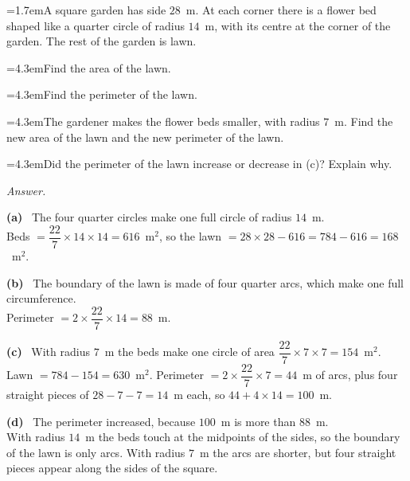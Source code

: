 \documentclass[11pt,a4paper]{article}
\newcommand{\nl}{\\[3pt]}
\newcounter{qn}
\newcommand{\ques}{\par\medskip\refstepcounter{qn}\noindent\hangindent=1.7em\hangafter=1\makebox[1.7em][l]{\textbf{\arabic{qn}.}}\ignorespaces}
\newcommand{\pc}[2]{\par\smallskip\noindent\hspace*{2em}\hangindent=4.3em\hangafter=1\makebox[2em][l]{(#1)}\hspace{0.3em}#2\par}
\newenvironment{answerblock}
  {\par\needspace{6\baselineskip}\smallskip\begingroup\small\linespread{1.2}\selectfont\color{muted}\noindent\textit{Answer.}\par}
  {\par\endgroup\medskip}
\newcommand{\ap}[1]{\par\smallskip\noindent\textbf{(#1)}\ }
\begin{document}
\ques A square garden has side $28$~m. At each corner there is a flower bed shaped like a quarter circle of radius $14$~m, with its centre at the corner of the garden. The rest of the garden is lawn.\par
\pc{a}{Find the area of the lawn.}
\pc{b}{Find the perimeter of the lawn.}
\pc{c}{The gardener makes the flower beds smaller, with radius $7$~m. Find the new area of the lawn and the new perimeter of the lawn.}
\pc{d}{Did the perimeter of the lawn increase or decrease in (c)? Explain why.}
\begin{center}
\end{center}
\begin{answerblock}
\ap{a} The four quarter circles make one full circle of radius $14$~m.\nl
Beds $=\dfrac{22}{7}\times14\times14=616$~m$^2$, so the lawn $=28\times28-616=784-616=168$~m$^2$.
\ap{b} The boundary of the lawn is made of four quarter arcs, which make one full circumference.\nl
Perimeter $=2\times\dfrac{22}{7}\times14=88$~m.
\ap{c} With radius $7$~m the beds make one circle of area $\dfrac{22}{7}\times7\times7=154$~m$^2$.\nl
Lawn $=784-154=630$~m$^2$. Perimeter $=2\times\dfrac{22}{7}\times7=44$~m of arcs, plus four straight pieces of $28-7-7=14$~m each, so $44+4\times14=100$~m.
\ap{d} The perimeter increased, because $100$~m is more than $88$~m.\nl
With radius $14$~m the beds touch at the midpoints of the sides, so the boundary of the lawn is only arcs. With radius $7$~m the arcs are shorter, but four straight pieces appear along the sides of the square.
\begin{center}
\end{center}
\end{answerblock}
\end{document}
